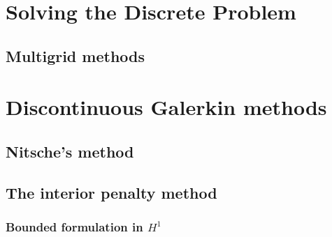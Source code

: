 \chapter{Solving the Discrete Problem}




\section{Multigrid methods}


\chapter{Discontinuous Galerkin methods}
\section{Nitsche's method}
\label{sec:nitsches-method}


\section{The interior penalty method}
\label{sec:interior-penalty}

\subsection{Bounded formulation in $H^1$}




\printindex

